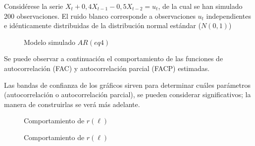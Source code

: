 \begin{ejemplo} Consid\'{e}rese la serie $X_{t}+0,4X_{t-1}-0,5X_{t-2}=u_{t}$, de la cual se han simulado 200 observaciones. El ruido blanco corresponde a 
observaciones $u_{t}$ independientes e id\'{e}nticamente distribuidas de la 
distribuci\'{o}n normal est\'{a}ndar ($N(0,1)$)

\begin{figure}[H]
\centering
\caption{Modelo simulado $AR(eq4)$}
\end{figure}

Se puede observar a continuaci\'{o}n el comportamiento de las funciones de 
autocorrelaci\'{o}n (FAC) y autocorrelaci\'{o}n parcial (FACP) estimadas.

Las bandas de confianza de los gr\'{a}ficos sirven para determinar 
cu\'{a}les par\'{a}metros (autocorrelaci\'{o}n o autocorrelaci\'{o}n 
parcial), se pueden considerar significativos; la manera de construirlas se 
ver\'{a} m\'{a}s adelante.

\begin{figure}[H]
\centering
\caption{Comportamiento de $r(\ell)$}
\end{figure}

\begin{figure}[H]
\centering
\caption{Comportamiento de $r(\ell)$}
\end{figure}

\end{ejemplo}


